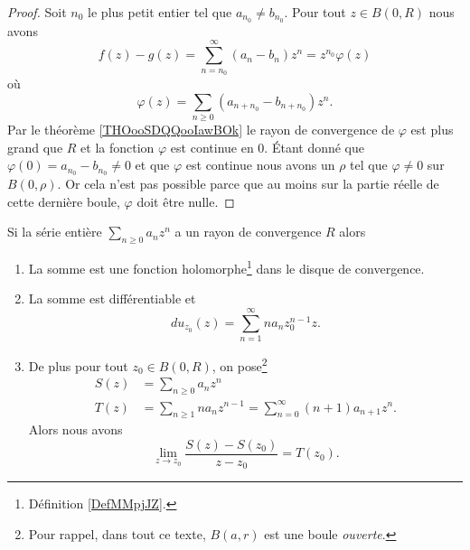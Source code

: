 \begin{proof}
	Soit \( n_0\) le plus petit entier tel que \( a_{n_0}\neq b_{n_0}\). Pour tout \( z\in B(0,R)\) nous avons
	\begin{equation}
		f(z)-g(z)=\sum_{n=n_0}^{\infty}(a_n-b_n)z^n=z^{n_0}\varphi(z)
	\end{equation}
	où
	\begin{equation}
		\varphi(z)=\sum_{n\geq 0}(a_{n+n_0}-b_{n+n_0})z^n.
	\end{equation}
	Par le théorème \ref{THOooSDQQooIawBOk} le rayon de convergence de \( \varphi\) est plus grand que \( R\) et la fonction \( \varphi\) est continue en \( 0\). Étant donné que \( \varphi(0)=a_{n_0}-b_{n_0}\neq 0\) et que \( \varphi\) est continue nous avons un \( \rho\) tel que \( \varphi\neq 0\) sur \( B(0,\rho)\). Or cela n'est pas possible parce que au moins sur la partie réelle de cette dernière boule, \( \varphi\) doit être nulle.
\end{proof}

\begin{proposition}     \label{PropSNMEooVgNqBP}
	Si la série entière \( \sum_{n\geq 0}a_nz^n\) a un rayon de convergence \( R\) alors
	\begin{enumerate}
		\item
		      La somme est une fonction holomorphe\footnote{Définition \ref{DefMMpjJZ}.} dans le disque de convergence.
		\item       \label{ItemUULDooEGRNiA}
		      La somme est différentiable et
		      \begin{equation}
			      du_{z_0}(z)=\sum_{n=1}^{\infty}na_nz_0^{n-1}z.
		      \end{equation}
		\item		\label{ITEMooHENIooRQCZwA}
		      De plus pour tout \( z_0\in B(0,R)\), on pose\footnote{Pour rappel, dans tout ce texte, \( B(a,r)\) est une boule \emph{ouverte}.}
		      \begin{subequations}
			      \begin{align}
				      S(z) & =\sum_{n\geq 0}a_nz^n                                          \\
				      T(z) & =\sum_{n\geq 1}na_nz^{n-1}=\sum_{n=0}^{\infty}(n+1)a_{n+1}z^n.
			      \end{align}
		      \end{subequations}
		      Alors  nous avons
		      \begin{equation}    \label{EqVQDPooOPICwN}
			      \lim_{z\to z_0}\frac{ S(z)-S(z_0) }{ z-z_0 }=T(z_0).
		      \end{equation}
	\end{enumerate}
\end{proposition}

